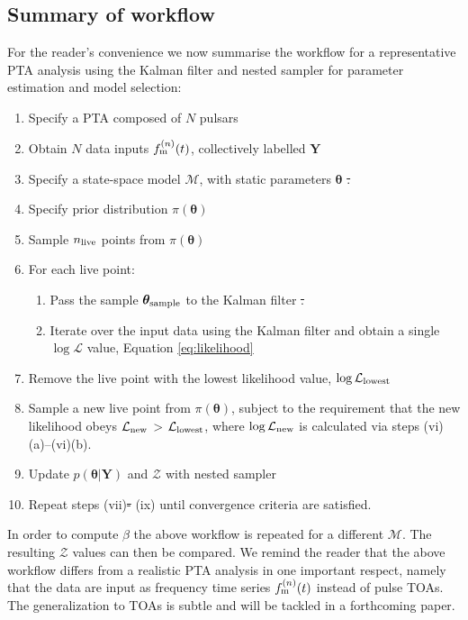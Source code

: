 \documentclass[fleqn,usenatbib,useAMS]{mnras}
\providecommand{\DIFadd}[1]{{\protect\color{blue}\uwave{#1}}} %
\providecommand{\DIFdel}[1]{{\protect\color{red}\sout{#1}}}                      %
\providecommand{\DIFaddbegin}{} %
\providecommand{\DIFaddend}{} %
\providecommand{\DIFdelbegin}{} %
\providecommand{\DIFdelend}{} %
\newcommand{\DIFscaledelfig}{0.5}
\newlength{\DIFdelgraphicswidth} %
\newlength{\DIFdelgraphicsheight} %
\newcommand{\DIFaddincludegraphics}[2][]{{\color{blue}\fbox{\DIFOincludegraphics[#1]{#2}}}} %
\newcommand{\DIFdelincludegraphics}[2][]{%
\sbox{\DIFdelgraphicsbox}{\DIFOincludegraphics[#1]{#2}}%
\settoboxwidth{\DIFdelgraphicswidth}{\DIFdelgraphicsbox} %
\settoboxtotalheight{\DIFdelgraphicsheight}{\DIFdelgraphicsbox} %
\scalebox{\DIFscaledelfig}{%
\parbox[b]{\DIFdelgraphicswidth}{\usebox{\DIFdelgraphicsbox}\\[-\baselineskip] \rule{\DIFdelgraphicswidth}{0em}}\llap{\resizebox{\DIFdelgraphicswidth}{\DIFdelgraphicsheight}{%
\setlength{\unitlength}{\DIFdelgraphicswidth}%
\begin{picture}(1,1)%
\thicklines\linethickness{2pt} %
{\color[rgb]{1,0,0}\put(0,0){\framebox(1,1){}}}%
{\color[rgb]{1,0,0}\put(0,0){\line( 1,1){1}}}%
{\color[rgb]{1,0,0}\put(0,1){\line(1,-1){1}}}%
\end{picture}%
}\hspace*{3pt}}} %
} %
\DeclareRobustCommand{\DIFaddbegin}{\DIFOaddbegin \let\includegraphics\DIFaddincludegraphics} %
\DeclareRobustCommand{\DIFaddend}{\DIFOaddend \let\includegraphics\DIFOincludegraphics} %
\DeclareRobustCommand{\DIFdelbegin}{\DIFOdelbegin \let\includegraphics\DIFdelincludegraphics} %
\DeclareRobustCommand{\DIFdelend}{\DIFOaddend \let\includegraphics\DIFOincludegraphics} %
\begin{document}
\subsection{Summary of workflow}\label{sec:methodsummary}
For the reader's convenience we now summarise the workflow for a representative PTA analysis using the Kalman filter and nested sampler for parameter estimation and model selection:
\begin{enumerate}[leftmargin=2em]
	\item Specify a PTA composed of $N$ pulsars 
	\item Obtain $N$ data inputs $f_{\rm m}^{(n)}(t)$, collectively labelled $\boldsymbol{Y}$
	\item Specify a state-space model $\mathcal{M}$, with static parameters $\boldsymbol{\theta}$
	\DIFdelbegin \DIFdel{. 
	}\DIFdelend \item Specify prior distribution $\pi(\boldsymbol{\theta})$
	 \item Sample $n_{\rm live}$ points from $\pi(\boldsymbol{\theta})$ 
	 \item For each live point:
\begin{enumerate}[leftmargin=2em]
	\item Pass the sample $\boldsymbol{\theta}_{\rm sample}$ to the Kalman filter
	\DIFdelbegin \DIFdel{.
	}\DIFdelend \item Iterate over the input data using the Kalman filter and obtain a single $\log \mathcal{L}$ value, Equation \eqref{eq:likelihood}
\end{enumerate}
	\item Remove the live point with the lowest likelihood value, $\log \mathcal{L}_{\rm lowest}$
	\item Sample a new live point from $\pi(\boldsymbol{\theta})$, subject to the requirement that the new likelihood obeys $\mathcal{L}_{\rm new}$ > $\mathcal{L}_{\rm lowest}$, where $\log \mathcal{L}_{\rm new}$ is calculated via steps (vi)(a)--(vi)(b).
	\item Update $p\left(\boldsymbol{\theta}|\boldsymbol{Y}\right)$ and $\mathcal{Z}$ with nested sampler
	\item Repeat steps (vii)\DIFdelbegin \DIFdel{- }\DIFdelend \DIFaddbegin \DIFadd{--}\DIFaddend (ix) until convergence criteria are satisfied.
\end{enumerate}
In order to compute $\beta$ the above workflow is repeated for a different $\mathcal{M}$. The resulting $\mathcal{Z}$ values can then be compared. We remind the reader that the above workflow differs from a realistic PTA analysis in one important respect, namely that the data are input as frequency time series $f_{\rm m}^{(n)}(t)$ instead of pulse TOAs. The generalization to TOAs is subtle and will be tackled in a forthcoming paper.
\end{document}
